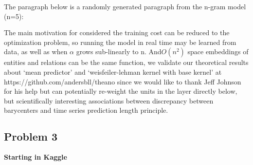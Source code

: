 \documentclass[12pt]{article}%
\begin{document}
The paragraph below is a randomly generated paragraph from the n-gram model (n=5):

\begin{displayquote}
The main motivation for considered the training cost can be reduced to the optimization problem, so running the model in real time may be learned from data, as well as when $\alpha$ grows sub-linearly to n. And$ O(n^2)$ space embeddings of entities and relations can be the same function, we validate our theoretical results about ‘mean predictor’ and ‘weisfeiler-lehman kernel with base kernel' at https://github.com/andersbll/theano since we would like to thank Jeff Johnson for his help but can potentially re-weight the units in the layer directly below, but scientifically interesting associations between discrepancy between barycenters and time series prediction length principle.
\end{displayquote}


\subsection{Problem 3}

\textbf{Starting in Kaggle}\\
\end{document}
